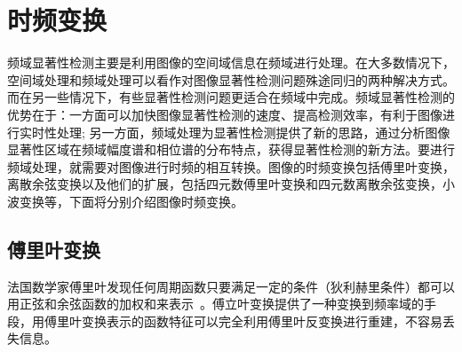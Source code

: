 \section{时频变换}
\label{2_2}

频域显著性检测主要是利用图像的空间域信息在频域进行处理。在大多数情况下，空间域处理和频域处理可以看作对图像显著性检测问题殊途同归的两种解决方式。而在另一些情况下，有些显著性检测问题更适合在频域中完成。频域显著性检测的优势在于：一方面可以加快图像显著性检测的速度、提高检测效率，有利于图像进行实时性处理; 另一方面，频域处理为显著性检测提供了新的思路，通过分析图像显著性区域在频域幅度谱和相位谱的分布特点，获得显著性检测的新方法。要进行频域处理，就需要对图像进行时频的相互转换。图像的时频变换包括傅里叶变换，离散余弦变换以及他们的扩展，包括四元数傅里叶变换和四元数离散余弦变换，小波变换等，下面将分别介绍图像时频变换。

\subsection{傅里叶变换}
\label{2_2_1}

法国数学家傅里叶发现任何周期函数只要满足一定的条件（狄利赫里条件）都可以用正弦和余弦函数的加权和来表示~\cite{ZhangZheng2010book}。傅立叶变换提供了一种变换到频率域的手段，用傅里叶变换表示的函数特征可以完全利用傅里叶反变换进行重建，不容易丢失信息。

